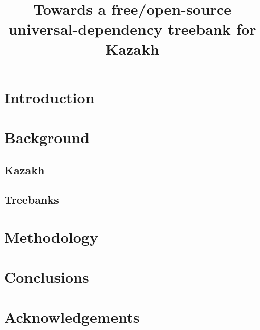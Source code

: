 \documentclass[a4paper,11pt,twocolumn]{article}
\title{Towards a free/open-source universal-dependency treebank for Kazakh}
\begin{document}
\maketitleabstract{}


\section{Introduction}

\citet{hargle}

\section{Background}

\subsection{Kazakh}

\subsection{Treebanks} %

\section{Methodology}

\section{Conclusions}

\section*{Acknowledgements}



\end{document}
